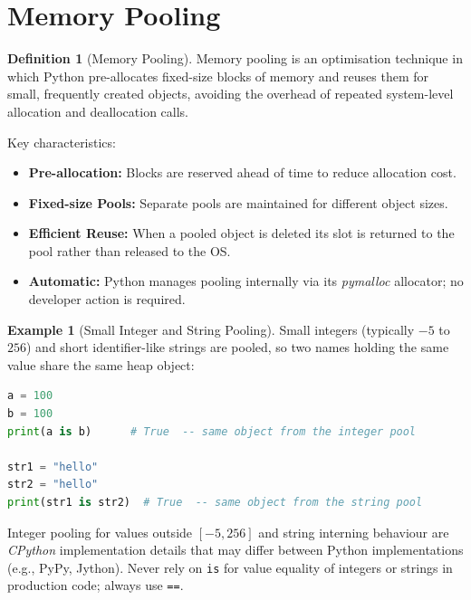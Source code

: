 \documentclass[11pt, a4paper, notitlepage]{report}
\theoremstyle{definition}
\newtheorem{definition}[theorem]{Definition}
\theoremstyle{remark}
\theoremstyle{definition}
\newtheorem{example}[theorem]{Example}
\begin{document}
\section{Memory Pooling}
\label{sec:pooling}

\begin{definition}[Memory Pooling]
Memory pooling is an optimisation technique in which Python pre-allocates fixed-size blocks of
memory and reuses them for small, frequently created objects, avoiding the overhead of repeated
system-level allocation and deallocation calls.
\end{definition}

Key characteristics:
\begin{itemize}
  \item \textbf{Pre-allocation:} Blocks are reserved ahead of time to reduce allocation cost.
  \item \textbf{Fixed-size Pools:} Separate pools are maintained for different object sizes.
  \item \textbf{Efficient Reuse:} When a pooled object is deleted its slot is returned to the
        pool rather than released to the OS.
  \item \textbf{Automatic:} Python manages pooling internally via its \emph{pymalloc}
        allocator; no developer action is required.
\end{itemize}

\begin{example}[Small Integer and String Pooling]
Small integers (typically $-5$ to $256$) and short identifier-like strings are pooled, so
two names holding the same value share the same heap object:
\begin{lstlisting}[language=Python]
a = 100
b = 100
print(a is b)      # True  -- same object from the integer pool

str1 = "hello"
str2 = "hello"
print(str1 is str2)  # True  -- same object from the string pool
\end{lstlisting}
\end{example}

\begin{warning}[title={Warning: Pool Sharing is an Implementation Detail}]
Integer pooling for values outside $[-5, 256]$ and string interning behaviour are
\emph{CPython} implementation details that may differ between Python implementations (e.g.,
PyPy, Jython). Never rely on \texttt{is} for value equality of integers or strings in
production code; always use \texttt{==}.
\end{warning}
\end{document}
